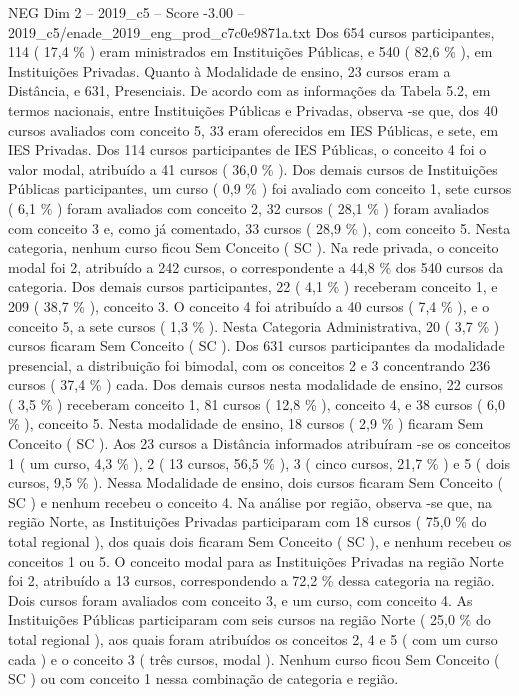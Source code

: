 \begin{textsample}{NEG Dim 2 – 2019\_c5 – Score -3.00 – 2019\_c5/enade\_2019\_eng\_prod\_c7c0e9871a.txt}
Dos 654 cursos participantes, 114 ( 17,4 \% ) eram ministrados em Instituições Públicas, e 540 ( 82,6 \% ), em Instituições Privadas.
Quanto à Modalidade de ensino, 23 cursos eram a Distância, e 631, Presenciais.
De acordo com as informações da Tabela 5.2, em termos nacionais, entre Instituições Públicas e Privadas, observa -se que, dos 40 cursos avaliados com conceito 5, 33 eram oferecidos em IES Públicas, e sete, em IES Privadas.
Dos 114 cursos participantes de IES Públicas, o conceito 4 foi o valor modal, atribuído a 41 cursos ( 36,0 \% ).
Dos demais cursos de Instituições Públicas participantes, um curso ( 0,9 \% ) foi avaliado com conceito 1, sete cursos ( 6,1 \% ) foram avaliados com conceito 2, 32 cursos ( 28,1 \% ) foram avaliados com conceito 3 e, como já comentado, 33 cursos ( 28,9 \% ), com conceito 5.
Nesta categoria, nenhum curso ficou Sem Conceito ( SC ).
Na rede privada, o conceito modal foi 2, atribuído a 242 cursos, o correspondente a 44,8 \% dos 540 cursos da categoria.
Dos demais cursos participantes, 22 ( 4,1 \% ) receberam conceito 1, e 209 ( 38,7 \% ), conceito 3.
O conceito 4 foi atribuído a 40 cursos ( 7,4 \% ), e o conceito 5, a sete cursos ( 1,3 \% ).
Nesta Categoria Administrativa, 20 ( 3,7 \% ) cursos ficaram Sem Conceito ( SC ).
Dos 631 cursos participantes da modalidade presencial, a distribuição foi bimodal, com os conceitos 2 e 3 concentrando 236 cursos ( 37,4 \% ) cada.
Dos demais cursos nesta modalidade de ensino, 22 cursos ( 3,5 \% ) receberam conceito 1, 81 cursos ( 12,8 \% ), conceito 4, e 38 cursos ( 6,0 \% ), conceito 5.
Nesta modalidade de ensino, 18 cursos ( 2,9 \% ) ficaram Sem Conceito ( SC ).
Aos 23 cursos a Distância informados atribuíram -se os conceitos 1 ( um curso, 4,3 \% ), 2 ( 13 cursos, 56,5 \% ), 3 ( cinco cursos, 21,7 \% ) e 5 ( dois cursos, 9,5 \% ).
Nessa Modalidade de ensino, dois cursos ficaram Sem Conceito ( SC ) e nenhum recebeu o conceito 4.
Na análise por região, observa -se que, na região Norte, as Instituições Privadas participaram com 18 cursos ( 75,0 \% do total regional ), dos quais dois ficaram Sem Conceito ( SC ), e nenhum recebeu os conceitos 1 ou 5.
O conceito modal para as Instituições Privadas na região Norte foi 2, atribuído a 13 cursos, correspondendo a 72,2 \% dessa categoria na região.
Dois cursos foram avaliados com conceito 3, e um curso, com conceito 4.
As Instituições Públicas participaram com seis cursos na região Norte ( 25,0 \% do total regional ), aos quais foram atribuídos os conceitos 2, 4 e 5 ( com um curso cada ) e o conceito 3 ( três cursos, modal ).
Nenhum curso ficou Sem Conceito ( SC ) ou com conceito 1 nessa combinação de categoria e região.

\end{textsample}
